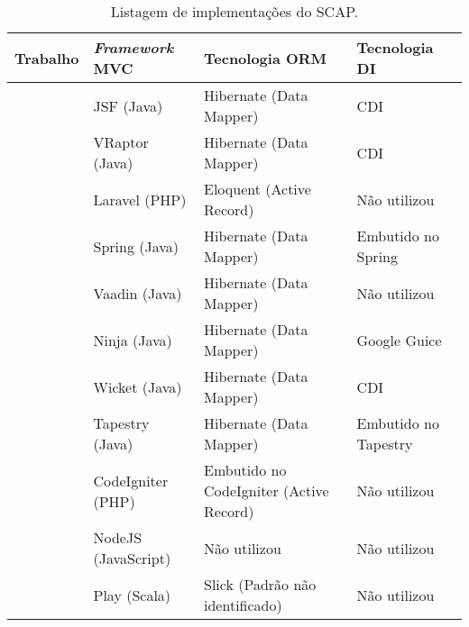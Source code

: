 \begin{table}[h]
	\caption{Listagem de implementações do SCAP.}
	\label{tbl-comparacao-trabalhos}
	\centering{}
	\begin{tabularx}{\textwidth}{ 
			| >{\hsize=0.4\hsize}X
			| >{\hsize=0.5\hsize}X	
			| >{\hsize=0.7\hsize}X
			| >{\hsize=0.4\hsize}X
			|
		}
		\hline
		\textbf{Trabalho} & 
		\textbf{\textit{Framework} MVC} & 
		\textbf{Tecnologia ORM} &
		\textbf{Tecnologia DI} \\
		\hline
		
		\citeonline{duarte:2014} &
		JSF (Java) & 
		Hibernate (Data Mapper) &
		CDI \\ 
		\hline 
		
		\citeonline{prado:2015} & 
		VRaptor (Java) & 
		Hibernate (Data Mapper) &
		CDI \\
		\hline 
		
		\citeonline{pinheiro:2017} & 
		Laravel (PHP) &
		Eloquent (Active Record)  &
		Não utilizou \\
		\hline
		
		\citeonline{matos:2017} & 
		Spring (Java) &
		Hibernate (Data Mapper)  &
		Embutido no Spring \\
		\hline 
		
		\citeonline{matos:2017} & 
		Vaadin (Java) &
		Hibernate (Data Mapper)  &
		Não utilizou \\
		\hline 
		
		\citeonline{avelar:2018} & 
		Ninja (Java) &
		Hibernate (Data Mapper)  &
		Google Guice \\
		\hline 
		
		\citeonline{ferreira:2018} & 
		Wicket (Java) &
		Hibernate (Data Mapper)  &
		CDI \\ 
		\hline 
		
		\citeonline{ferreira:2018} & 
		Tapestry (Java) &
		Hibernate (Data Mapper)  &
		Embutido no Tapestry \\ 
		\hline 
		
		\citeonline{meirelles:2019} & 
		CodeIgniter (PHP) &
		Embutido no CodeIgniter (Active Record) &
		Não utilizou \\
		\hline 
		
		\citeonline{meirelles:2019} & 
		NodeJS (JavaScript) &
		Não utilizou  &
		Não utilizou \\ 
		\hline 
		
		\citeonline{guterres:2019} & 
		Play (Scala) &
		Slick (Padrão não identificado)  &
		Não utilizou \\ 
		\hline 
		

\end{tabularx}
\end{table}
